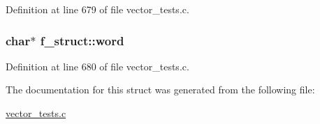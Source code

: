 Definition at line 679 of file vector\-\_\-tests.\-c.

\hypertarget{structf__struct_aa8f65f08c5e6180da916f9001438eab5}{
\subsubsection[{word}]{\setlength{\rightskip}{0pt plus 5cm}char$\ast$ f\-\_\-struct\-::word}}\label{structf__struct_aa8f65f08c5e6180da916f9001438eab5}


Definition at line 680 of file vector\-\_\-tests.\-c.



The documentation for this struct was generated from the following file\-:\begin{DoxyCompactItemize}
\item 
\hyperlink{vector__tests_8c}{vector\-\_\-tests.\-c}\end{DoxyCompactItemize}
